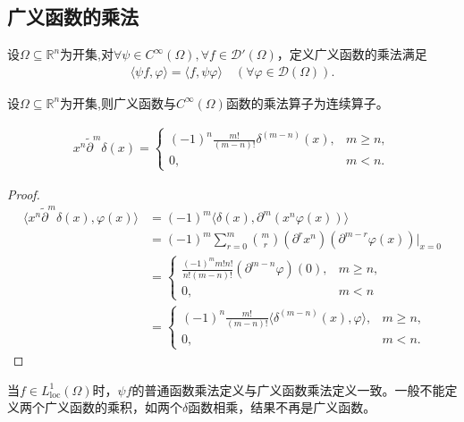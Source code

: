 \documentclass[../../main.tex]{subfiles}%
\begin{document}
\subsection{广义函数的乘法}

\begin{definition}
设$\Omega\subseteq\mathbb{R}^n$为开集,对$\forall\psi\in C^\infty(\Omega),\forall f\in\mathscr{D}'(\Omega)$，定义广义函数的乘法满足
\begin{align*}
\langle\psi f,\varphi\rangle=\langle f,\psi\varphi\rangle\quad(\forall\varphi\in\mathscr{D}(\Omega)).
\end{align*}
\end{definition}

\begin{proposition}
设$\Omega\subseteq\mathbb{R}^n$为开集,则广义函数与$C^\infty(\Omega)$函数的乘法算子为连续算子。
\end{proposition}

\begin{example}
\begin{align*}
x^n\widetilde{\partial}^m\delta(x)=
\begin{cases}
(-1)^n\frac{m!}{(m-n)!}\delta^{(m-n)}(x),&m\geqslant n,\\
0,&m<n.
\end{cases}
\end{align*}
\end{example}
\begin{proof}
\begin{align*}
\langle x^n\widetilde{\partial}^m\delta(x),\varphi(x)\rangle&=(-1)^m\langle\delta(x),\partial^m(x^n\varphi(x))\rangle\\
&=(-1)^m\sum\limits_{r=0}^m\binom{m}{r}(\partial^r x^n)(\partial^{m-r}\varphi(x))\bigg|_{x=0}\\
&=
\begin{cases}
\frac{(-1)^m m!n!}{n!(m-n)!}(\partial^{m-n}\varphi)(0),&m\geqslant n,\\
0,&m<n
\end{cases}\\
&=
\begin{cases}
(-1)^n\frac{m!}{(m-n)!}\langle\delta^{(m-n)}(x),\varphi\rangle,&m\geqslant n,\\
0,&m<n.
\end{cases}
\end{align*}
\end{proof}

\begin{remark}
当$f\in L^1_{\mathrm{loc}}(\Omega)$时，$\psi f$的普通函数乘法定义与广义函数乘法定义一致。一般不能定义两个广义函数的乘积，如两个$\delta$函数相乘，结果不再是广义函数。
\end{remark}
\end{document}
